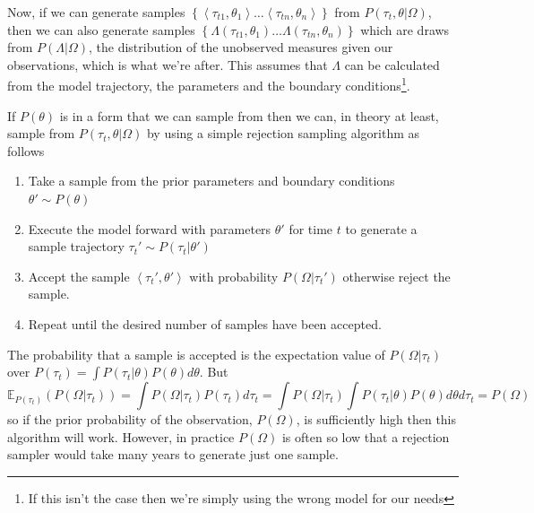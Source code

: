 \documentclass{article}
\begin{document}
Now, if we can generate samples $\left\{\left<\tau_{t1},\theta_1\right> \dots \left<\tau_{tn},\theta_n\right> \right\}$ from $P(\tau_t,\theta|\Omega)$, then we can also generate samples $\left\{\Lambda(\tau_{t1},\theta_1) \dots \Lambda(\tau_{tn},\theta_n) \right\}$ which are draws from $P(\Lambda|\Omega)$, the distribution of the unobserved measures given our observations, which is what we're after. This assumes that $\Lambda$ can be calculated from the model trajectory, the parameters and the boundary conditions\footnote{If this isn't the case then we're simply using the wrong model for our needs}. 

If $P(\theta)$ is in a form that we can sample from then we can, in theory at least, sample from $P(\tau_t,\theta|\Omega)$ by using a simple rejection sampling algorithm as follows
\begin{enumerate}
\item Take a sample from the prior parameters and boundary conditions $\theta' \sim P(\theta)$
\item Execute the model forward with parameters $\theta'$ for time $t$ to generate a sample trajectory $\tau_t' \sim P(\tau_t|\theta')$
\item Accept the sample $\left<\tau_t',\theta'\right>$ with probability $P(\Omega|\tau_t')$ otherwise reject the sample.
\item Repeat until the desired number of samples have been accepted. 
\end{enumerate}

The probability that a sample is accepted is the expectation value of $P(\Omega|\tau_t)$ over $P(\tau_t) = \int P(\tau_t|\theta)P(\theta) d\theta$. But
\[
\mathbb{E}_{P(\tau_t)}(P(\Omega|\tau_t)) = \int P(\Omega|\tau_t)P(\tau_t) d\tau_t = \int P(\Omega|\tau_t) \int P(\tau_t|\theta)P(\theta) d\theta d\tau_t = P(\Omega)
\]
so if the prior probability of the observation, $P(\Omega)$, is sufficiently high then this algorithm will work. However, in practice $P(\Omega)$ is often so low that a rejection sampler would take many years to generate just one sample.
\end{document}

